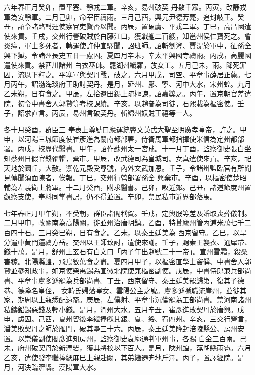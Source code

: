 \begin{pinyinscope}
 六年春正月癸卯，置平塞、靜戎二軍。辛亥，易州破契
 丹數千眾。丙寅，改靜戎軍為安靜軍。二月己卯，命宰臣禱雨。三月己酉，興元尹德芳薨，追封岐王。癸丑，詔令諸路轉運使察官吏賢否以聞。丙辰，置破虜、平戎二軍。丁巳，高昌國遣使來貢。壬戌，交州行營破賊於白藤江口，獲戰艦二百艘，知邕州侯仁寶死之。會炎瘴，軍士多死者，轉運使許仲宣驛聞，詔班師。詔斬劉澄、賈湜於軍中，征孫全興下獄。令諸州長吏五日一慮囚。夏四月辛未，幸太平興國寺禱雨。丙戌，高麗國遣使來貢。禁西川諸州
 白衣巫師。罷湖州織羅，放女工。五月己未，雨。降死罪囚，流以下釋之。平塞軍與契丹戰，破之。六月甲戌，司空、平章事薛居正薨。七月丙午，詔渤海琰府王助討契丹。是月，延州、鄜、寧、河中大水，宋州蝗。九月乙未朔，日有食之。甲辰，左拾遺田錫上疏極諫，詔嘉獎之。丙午，置京朝官差遣院，初令中書舍人郭贄等考校課績。辛亥，以趙普為司徒，石熙載為樞密使。壬子，詔求直言。丙辰，易州言破契丹。斬綿州妖賊王禧等十人。



 冬十月癸酉，群臣三
 奉表上尊號曰應運統睿文英武大聖至明廣孝皇帝，許之。甲申，以河陽三城節度使崔彥進為關南都部署，侍衛馬軍都指揮使米信為定州都部署。丙戌，校歷代醫書。甲午，詔作蘇州太一宮成。十一月丁酉，監察御史張白坐知蔡州日假官錢糴糶，棄市。甲辰，改武德司為皇城司。女真遣使來貢。辛亥，祀天地於圜丘，大赦。禦乾元殿受尊號，內外文武加恩。壬子，令諸州監臨官有所聞見傳聞須面陳者，俟報。丁巳，交州行營部署孫全
 興棄市。辛酉，以樞密使楚昭輔為左驍衛上將軍。十二月癸酉，購求醫書。己卯，畋近郊。己丑，諸道節度州置觀察支使，奉料同掌書記，仍不得並置。辛卯，禁民私市近界部落馬。



 七年春正月甲午朔，不受朝，群臣詣閣稱賀。壬戌，定輿服等差及婚取喪葬儀制。二月甲申，改關南為高陽關，徙並州治唐明鎮。乙酉，特貰廬州管內逋米萬七千二百四十石。三月癸巳朔，日有食之。乙未，以秦王廷美為
 西京留守。乙巳，以旱分遣中黃門遍禱方岳。交州以王師致討，遣使來謝。壬子，賜秦王襲衣、通犀帶、錢十萬。是月，舒州上玄石有白文曰「丙子年出趙號二十一帝」。宣州雪霜，殺桑害稼。北陽縣蝗，飛鳥數萬食之盡。夏四月甲子，以樞密直學士竇偁、中書舍人郭贄並參知政事，如京使柴禹錫為宣徽北院使兼樞密副使。戊辰，中書侍郎兼兵部尚書、平章事盧多遜罷為兵部尚書。丁丑，西京留守、秦王廷美罷歸第，復其子德恭、德隆名皇侄，
 女韓氏婦落皇女、雲陽公主之號。盧多遜褫職流崖州，並徙其家，期周以上親悉配遠裔。庚辰，左僕射、平章事沉倫罷為工部尚書。禁河南諸州私鑄鉛錫惡錢及輕小錢。是月，潤州大水。五月辛丑，崔彥進敗契丹於唐興。戊申，慮囚。己酉，夏州留後李繼捧獻其銀、夏、綏、宥四州。辛亥，三交行營言，潘美敗契丹之師於雁門，破其壘三十六。丙辰，秦王廷美降封涪陵縣公、房州安置。以崇儀副使閻彥進知房州，監察御史袁廓通判軍州事，各賜
 白金三百兩。己未，府州破契丹於新澤砦，獲其將校以下百人。是月，陜州蝗，蕪湖縣雨雹。六月乙亥，遣使發李繼捧緦麻巳上親赴闕，其弟繼遷奔地斤澤。丙子，置譯經院。是月，河決臨濟縣。漢陽軍大水。




\end{pinyinscope}
